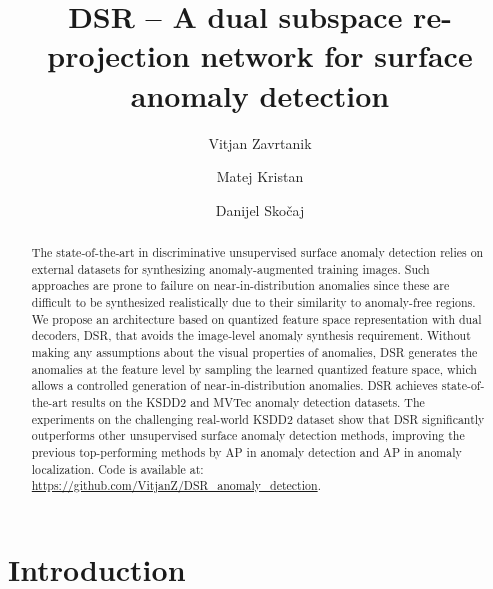 \documentclass[runningheads]{llncs}
\begin{document}
\pagestyle{headings}
\mainmatter
\def\ECCVSubNumber{7955}  

\title{DSR -- A dual subspace re-projection network for surface anomaly detection}



\author{Vitjan Zavrtanik \and Matej Kristan \and Danijel Skočaj}

\maketitle

\begin{abstract}


The state-of-the-art in discriminative unsupervised surface anomaly detection relies on external datasets for synthesizing anomaly-augmented training images. Such approaches are prone to failure on near-in-distribution anomalies since these are difficult to be synthesized realistically due to their similarity to anomaly-free regions. We propose an architecture based on quantized feature space representation with dual decoders, DSR, that avoids the image-level anomaly synthesis requirement. Without making any assumptions about the visual properties of anomalies, DSR generates the anomalies at the feature level by sampling the learned quantized feature space, which allows a controlled generation of near-in-distribution anomalies.
DSR achieves state-of-the-art results on the KSDD2 and MVTec anomaly detection datasets. The experiments on the challenging real-world KSDD2 dataset show that DSR significantly outperforms other unsupervised surface anomaly detection methods, improving the previous top-performing methods by  AP in anomaly detection and  AP in anomaly localization. Code is available at: \href{https://github.com/VitjanZ/DSR_anomaly_detection}{https://github.com/VitjanZ/DSR\_anomaly\_detection}.
\end{abstract}


\section{Introduction}
\end{document}
